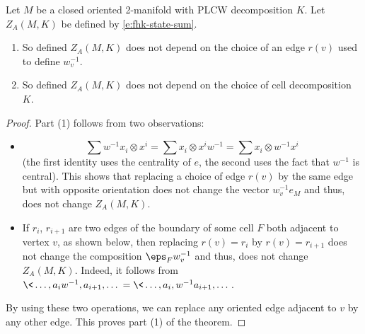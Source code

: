 \begin{theorem}\label{t:fhk1}
  Let $M$ be a closed oriented 2-manifold with PLCW decomposition $K$. Let
  $Z_A(M,K)$ be defined by \eqref{e:fhk-state-sum}.
  \begin{enumerate}
    \item So defined $Z_A(M,K)$ does not depend on the choice of an edge $r(v)$
      used to define $w^{-1}_v$.
    \item So defined $Z_A(M,K)$ does not depend on the choice of cell
      decomposition $K$.
  \end{enumerate}
\end{theorem}
\begin{proof}
  Part (1) follows from two observations:
  \begin{itemize}
    \item
      $$
      \sum w^{-1}x_i\otimes x^i=
      \sum x_i\otimes x^i w^{-1}=
      \sum x_i\otimes w^{-1}x^i
      $$
      (the first identity uses the centrality of $e$, the second uses the fact
      that  $w^{-1}$ is central). This shows that replacing a choice of edge
      $r(v)$ by the same edge but with opposite orientation does not change the
      vector $w^{-1}_ve_M$ and thus, does not change $Z_A(M,K)$.
    \item
      If $r_i$, $r_{i+1}$ are two edges of the boundary of some cell $F$ both
      adjacent to vertex $v$, as shown below, then replacing
      $r(v)=r_i$ by $r(v)= r_{i+1}$ does not change the composition
      $\eps_F w^{-1}_v$ and thus, does not
      change $Z_A(M,K)$. Indeed, it follows from
      $\<\dots, a_{i}w^{-1}, a_{i+1}, \dots\> =
      \<\dots, a_{i}, w^{-1}a_{i+1}, \dots\>$.

      \begin{center}
      \end{center}

  \end{itemize}
  By using these two operations, we can replace any oriented edge adjacent
  to $v$ by any other edge. This proves part (1) of the theorem.


\end{proof}
